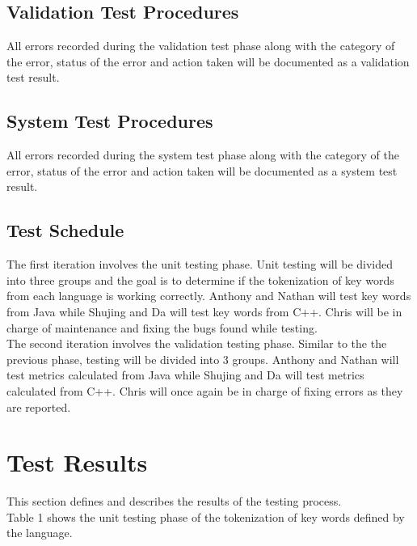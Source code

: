 \documentclass{scrreprt}
\begin{document}
	\section{Validation Test Procedures}
	All errors recorded during the validation test phase along with the category of the error, status of the error and action taken will be documented as a validation test result.
	
	\section{System Test Procedures}
	All errors recorded during the system test phase along with the category of the error, status of the error and action taken will be documented as a system test result.
	
	\section{Test Schedule}
	The first iteration involves the unit testing phase. Unit testing will be divided into three groups and the goal is to determine if the tokenization of key words from each language is working correctly. Anthony and Nathan will test key words from Java while Shujing and Da will test key words from C++. Chris will be in charge of maintenance and fixing the bugs found while testing.\\
	
	The second iteration involves the validation testing phase. Similar to the the previous phase, testing will be divided into 3 groups. Anthony and Nathan will test metrics calculated from Java while Shujing and Da will test metrics calculated from C++. Chris will once again be in charge of fixing errors as they are reported.
	

	{\let\clearpage\relax \chapter{Test Results}}
	This section defines and describes the results of the testing process.\\
	
	Table 1 shows the unit testing phase of the tokenization of key words defined by the language.\\
	
\end{document}
